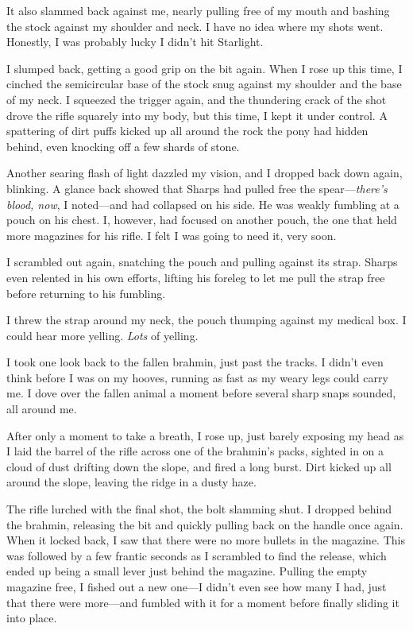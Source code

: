 It also slammed back against me, nearly pulling free of my mouth and bashing the stock against my shoulder and neck. I have no idea where my shots went. Honestly, I was probably lucky I didn’t hit Starlight.

I slumped back, getting a good grip on the bit again. When I rose up this time, I cinched the semicircular base of the stock snug against my shoulder and the base of my neck. I squeezed the trigger again, and the thundering crack of the shot drove the rifle squarely into my body, but this time, I kept it under control. A spattering of dirt puffs kicked up all around the rock the pony had hidden behind, even knocking off a few shards of stone.

Another searing flash of light dazzled my vision, and I dropped back down again, blinking. A glance back showed that Sharps had pulled free the spear—\textit{there’s blood, now}, I noted—and had collapsed on his side. He was weakly fumbling at a pouch on his chest. I, however, had focused on another pouch, the one that held more magazines for his rifle. I felt I was going to need it, very soon.

I scrambled out again, snatching the pouch and pulling against its strap. Sharps even relented in his own efforts, lifting his foreleg to let me pull the strap free before returning to his fumbling.

I threw the strap around my neck, the pouch thumping against my medical box. I could hear more yelling. \textit{Lots} of yelling.

I took one look back to the fallen brahmin, just past the tracks. I didn’t even think before I was on my hooves, running as fast as my weary legs could carry me. I dove over the fallen animal a moment before several sharp snaps sounded, all around me.

After only a moment to take a breath, I rose up, just barely exposing my head as I laid the barrel of the rifle across one of the brahmin’s packs, sighted in on a cloud of dust drifting down the slope, and fired a long burst. Dirt kicked up all around the slope, leaving the ridge in a dusty haze.

The rifle lurched with the final shot, the bolt slamming shut. I dropped behind the brahmin, releasing the bit and quickly pulling back on the handle once again. When it locked back, I saw that there were no more bullets in the magazine. This was followed by a few frantic seconds as I scrambled to find the release, which ended up being a small lever just behind the magazine. Pulling the empty magazine free, I fished out a new one—I didn’t even see how many I had, just that there were more—and fumbled with it for a moment before finally sliding it into place.

